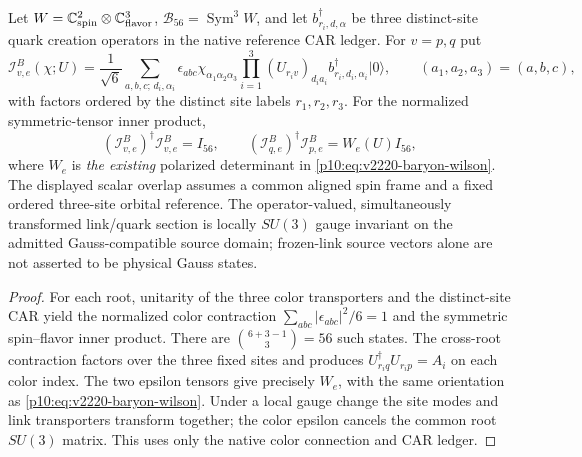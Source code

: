 \documentclass[12pt,a4paper]{article}
\begin{document}
\begin{proposition}
\label{p10:prop:v3023-marked-baryon-source-overlap}
Let $W=\mathbb C^2_{\rm spin}\otimes\mathbb C^3_{\rm flavor}$,
$\mathcal B_{56}=\operatorname{Sym}^3W$, and let
$b^\dagger_{r_i,d,\alpha}$ be three distinct-site quark creation
operators in the native reference CAR ledger. For $v=p,q$ put
\[
\mathcal I_{v,e}^B(\chi;U)=\frac1{\sqrt6}
\sum_{a,b,c;\,d_i,\alpha_i}
\epsilon_{abc}\chi_{\alpha_1\alpha_2\alpha_3}
\prod_{i=1}^3(U_{r_iv})_{d_ia_i}
 b^\dagger_{r_i,d_i,\alpha_i}|0\rangle,
\qquad(a_1,a_2,a_3)=(a,b,c),
\]
with factors ordered by the distinct site labels $r_1,r_2,r_3$.
For the normalized symmetric-tensor inner product,
\[
\boxed{(\mathcal I_{v,e}^B)^\dagger\mathcal I_{v,e}^B=I_{56},
\qquad(\mathcal I_{q,e}^B)^\dagger\mathcal I_{p,e}^B
 =W_e(U)I_{56},}
\]
where $W_e$ is \emph{the existing} polarized determinant in
\eqref{p10:eq:v2220-baryon-wilson}. The displayed scalar overlap
assumes a common aligned spin frame and a fixed ordered three-site
orbital reference. The operator-valued, simultaneously transformed
link/quark section is locally $SU(3)$ gauge invariant on the
admitted Gauss-compatible source domain; frozen-link source vectors
alone are not asserted to be physical Gauss states.
\end{proposition}
\begin{proof}
For each root, unitarity of the three color transporters and
the distinct-site CAR yield the normalized color contraction
$\sum_{abc}|\epsilon_{abc}|^2/6=1$ and the symmetric spin--flavor
inner product. There are $\binom{6+3-1}{3}=56$ such states. The
cross-root contraction factors over the three fixed sites and
produces $U_{r_iq}^\dagger U_{r_ip}=A_i$ on each color index.
The two epsilon tensors give precisely $W_e$, with the same
orientation as \eqref{p10:eq:v2220-baryon-wilson}. Under a local
gauge change the site modes and link transporters transform together;
the color epsilon cancels the common root $SU(3)$ matrix. This
uses only the native color connection and CAR ledger.
\end{proof}
\end{document}
